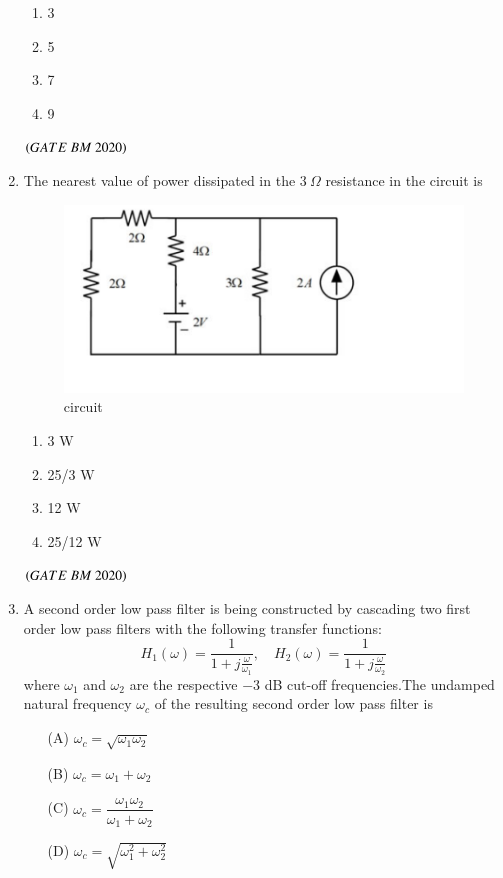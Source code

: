 \documentclass[journal,12pt,onecolumn]{IEEEtran}
\theoremstyle{remark}
\begin{document}
\begin{enumerate}
\begin{enumerate}[label=\alph*)] 
\item\hspace{0.5cm}3
\item\hspace{0.5cm}5
\item\hspace{0.5cm}7
\item\hspace{0.5cm}9
\end{enumerate}  
\hfill $\left(GATE\ BM\ 2020\right)$\\

\item The nearest value of power dissipated in the $3~\Omega$ resistance in the circuit is 
\begin{figure}[H]\centering
\includegraphics[width=0.4\columnwidth]{Figs/fig5.png}
\caption{circuit}
\label{fig:placeholder}
\end{figure}
\begin{enumerate}[label=\alph*)] 
\item\hspace{0.5cm}3 W
\item\hspace{0.5cm}25/3 W
\item\hspace{0.5cm}12 W
\item\hspace{0.5cm}25/12 W
\end{enumerate} 
\hfill $\left(GATE\ BM\ 2020\right)$\\

\item A second order low pass filter is being constructed by cascading two first order low pass filters with the following transfer functions:  
\[
H_1(\omega) = \frac{1}{1 + j\frac{\omega}{\omega_1}}, 
\quad
H_2(\omega) = \frac{1}{1 + j\frac{\omega}{\omega_2}}
\]
where $\omega_1$ and $\omega_2$ are the respective $-3$ dB cut-off frequencies.The undamped natural frequency $\omega_c$ of the resulting second order low pass filter is  
\begin{enumerate}
    \item[(A)] $\omega_c = \sqrt{\omega_1 \omega_2}$
    \item[(B)] $\omega_c = \omega_1 + \omega_2$
    \item[(C)] $\omega_c = \dfrac{\omega_1 \omega_2}{\omega_1 + \omega_2}$
    \item[(D)] $\omega_c = \sqrt{\omega_1^{2} + \omega_2^{2}}$
\end{enumerate}


\end{enumerate}
\end{document}
